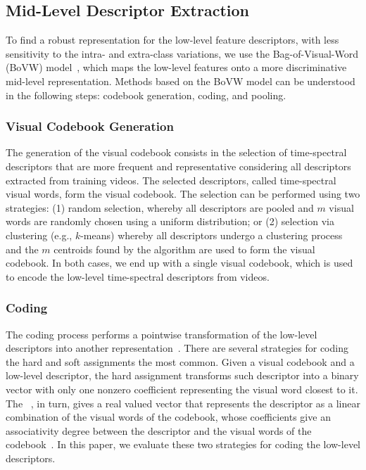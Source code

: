\subsection{Mid-Level Descriptor Extraction}
To find a robust representation for the low-level feature descriptors, with less sensitivity to the intra- and extra-class variations, we use the Bag-of-Visual-Word (BoVW) model~\cite{Sivic:ICCV:2003}, which maps the low-level features onto a more discriminative mid-level representation. Methods based on the BoVW model can be understood in the following steps:  codebook generation, coding, and pooling.

\subsubsection{Visual Codebook Generation}
The generation of the visual codebook consists in the selection of time-spectral descriptors that are more frequent and representative considering all descriptors extracted from training videos. The selected descriptors, called time-spectral visual words, form the visual codebook. The selection can be performed using two strategies: (1) random selection, whereby all descriptors are pooled and $m$ visual words are randomly chosen using a uniform distribution; or (2) selection via clustering (e.g., $k$-means) whereby all descriptors undergo a clustering process and the $m$ centroids found by the algorithm are used to form the visual codebook. In both cases, we end up with a single visual codebook, which is used to encode the low-level time-spectral descriptors from videos.


\subsubsection{Coding}
The coding process performs a pointwise transformation of the low-level descriptors into another representation~\cite{Boureau:CVPR:2010}. There are several strategies for coding  the hard and soft assignments the most common. Given a visual codebook and a low-level descriptor, the hard assignment transforms such descriptor into a binary vector with only one nonzero coefficient representing the visual word closest to it. The ~\cite{Gemert:ECCV:2008}, in turn, gives a real valued vector that represents the descriptor as a linear combination of the visual words of the codebook, whose coefficients give an associativity degree between the descriptor and the visual words of the codebook~\cite{Liu:ICCV:2011}. In this paper, we evaluate these two strategies for coding the low-level descriptors.

